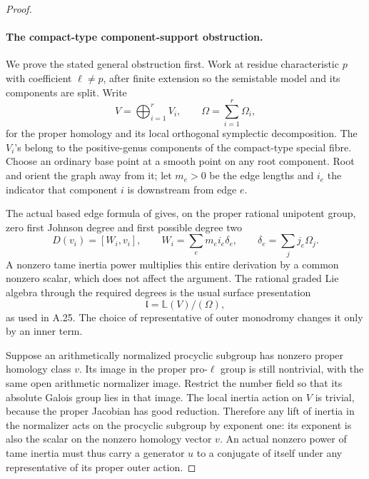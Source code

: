 \begin{proof}
\paragraph{The compact-type component-support obstruction.}
We prove the stated general obstruction first. Work at
residue characteristic \(p\) with coefficient
\(\ell\ne p\), after finite extension so the
semistable model and its components are split. Write
\[
               V=\bigoplus_{i=1}^r V_i,
               \qquad\Omega=\sum_{i=1}^r\Omega_i,
                                                               \tag{A.47.1}
\]
for the proper homology and its local orthogonal
symplectic decomposition. The \(V_i\)'s belong to
the positive-genus components of the compact-type
special fibre. Choose an ordinary base point at a
smooth point on any root component. Root and orient
the graph away from it; let \(m_e>0\) be the edge
lengths and \(i_e\) the indicator that component
\(i\) is downstream from edge \(e\).

The actual based edge formula of
\cite[Definition 3.1.5 and Theorem 3.1.6]{fghBettsDogra}
gives, on the proper rational unipotent group, zero
first Johnson degree and first possible degree two
\[
 D(v_i)=[W_i,v_i],\qquad
 W_i=\sum_e m_ei_e\delta_e,\qquad
 \delta_e=\sum_j j_e\Omega_j.                        \tag{A.47.2}
\]
A nonzero tame inertia power multiplies this entire
derivation by a common nonzero scalar, which does not
affect the argument. The rational graded Lie algebra
through the required degrees is the usual surface
presentation
\[
                           \mathfrak l=\mathbb L(V)/(\Omega),
                                                               \tag{A.47.3}
\]
as used in A.25. The choice of representative of
outer monodromy changes it only by an inner term.

Suppose an arithmetically normalized procyclic
subgroup has nonzero proper homology class \(v\).
Its image in the proper pro-\(\ell\) group is still
nontrivial, with the same open arithmetic normalizer
image. Restrict the number field so that its absolute
Galois group lies in that image. The local inertia
action on \(V\) is trivial, because the proper
Jacobian has good reduction. Therefore any lift of
inertia in the normalizer acts on the procyclic
subgroup by exponent one: its exponent is also the
scalar on the nonzero homology vector \(v\).
An actual nonzero power of tame inertia must thus
carry a generator \(u\) to a conjugate of itself
under any representative of its proper outer action.


\end{proof}
